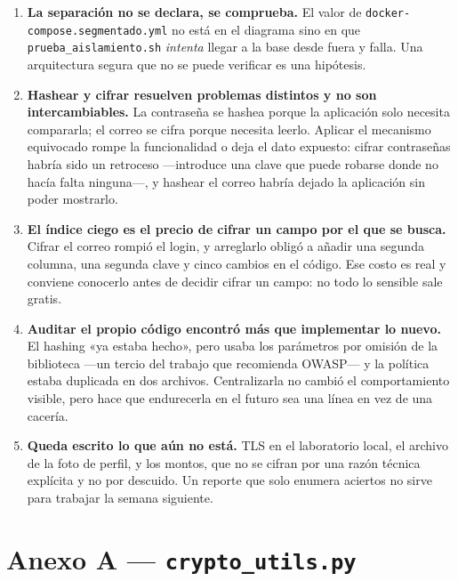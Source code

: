 \documentclass[11pt,letterpaper]{article}
\begin{document}
\begin{enumerate}[leftmargin=1.4em,itemsep=5pt]
  \item \textbf{La separación no se declara, se comprueba.} El valor de
        \texttt{docker-compose.segmentado.yml} no está en el diagrama sino en
        que \texttt{prueba\_aislamiento.sh} \emph{intenta} llegar a la base
        desde fuera y falla. Una arquitectura segura que no se puede verificar
        es una hipótesis.

  \item \textbf{Hashear y cifrar resuelven problemas distintos y no son
        intercambiables.} La contraseña se hashea porque la aplicación solo
        necesita compararla; el correo se cifra porque necesita leerlo. Aplicar
        el mecanismo equivocado rompe la funcionalidad o deja el dato expuesto:
        cifrar contraseñas habría sido un retroceso —introduce una clave que
        puede robarse donde no hacía falta ninguna—, y hashear el correo habría
        dejado la aplicación sin poder mostrarlo.

  \item \textbf{El índice ciego es el precio de cifrar un campo por el que se
        busca.} Cifrar el correo rompió el login, y arreglarlo obligó a añadir
        una segunda columna, una segunda clave y cinco cambios en el código.
        Ese costo es real y conviene conocerlo antes de decidir cifrar un campo:
        no todo lo sensible sale gratis.

  \item \textbf{Auditar el propio código encontró más que implementar lo
        nuevo.} El hashing «ya estaba hecho», pero usaba los parámetros por
        omisión de la biblioteca —un tercio del trabajo que recomienda OWASP—
        y la política estaba duplicada en dos archivos. Centralizarla no cambió
        el comportamiento visible, pero hace que endurecerla en el futuro sea
        una línea en vez de una cacería.

  \item \textbf{Queda escrito lo que aún no está.} TLS en el laboratorio local,
        el archivo de la foto de perfil, y los montos, que no se cifran por una
        razón técnica explícita y no por descuido. Un reporte que solo enumera
        aciertos no sirve para trabajar la semana siguiente.
\end{enumerate}

\newpage
\section*{Anexo A — \texttt{crypto\_utils.py}}
\end{document}

